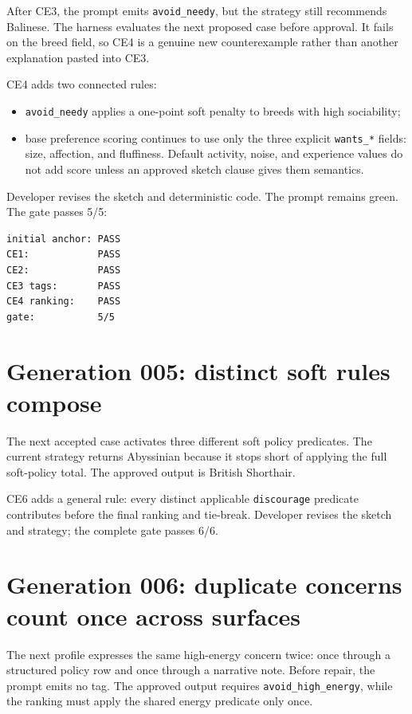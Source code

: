 After CE3, the prompt emits \texttt{avoid\_needy}, but the strategy still recommends Balinese. The
harness evaluates the next proposed case before approval. It fails on the breed field, so CE4
is a genuine new counterexample rather than another explanation pasted into CE3.

CE4 adds two connected rules:

\begin{itemize}
\tightlist
\item
  \texttt{avoid\_needy} applies a one-point soft penalty to breeds with high sociability;
\item
  base preference scoring continues to use only the three explicit \texttt{wants\_*} fields: size,
  affection, and fluffiness. Default activity, noise, and experience values do not add score
  unless an approved sketch clause gives them semantics.
\end{itemize}

Developer revises the sketch and deterministic code. The prompt remains green. The gate
passes 5/5:

\begin{verbatim}
initial anchor: PASS
CE1:            PASS
CE2:            PASS
CE3 tags:       PASS
CE4 ranking:    PASS
gate:           5/5
\end{verbatim}

\section{Generation 005: distinct soft rules compose}\label{generation-005-distinct-soft-rules-compose}

The next accepted case activates three different soft policy predicates. The current strategy
returns Abyssinian because it stops short of applying the full soft-policy total. The approved
output is British Shorthair.

CE6 adds a general rule: every distinct applicable \texttt{discourage} predicate contributes before the
final ranking and tie-break. Developer revises the sketch and strategy; the complete gate passes
6/6.

\section{Generation 006: duplicate concerns count once across surfaces}\label{generation-006-duplicate-concerns-count-once-across-surfaces}

The next profile expresses the same high-energy concern twice: once through a structured policy
row and once through a narrative note. Before repair, the prompt emits no tag. The approved output
requires \texttt{avoid\_high\_energy}, while the ranking must apply the shared energy predicate only once.

